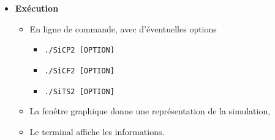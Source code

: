 \begin{itemize}[leftmargin=1cm, label=, itemsep=0pt]
\begin{itemize}[leftmargin=1cm, label=, itemsep=0pt]
\begin{itemize}[leftmargin=1cm, label=, itemsep=0pt]
		\end{itemize}
	\end{itemize}
%
\item {\bf Exécution}
	\begin{itemize}[leftmargin=1cm, label=, itemsep=0pt]
	\item En ligne de commande, avec d'éventuelles options
		\begin{itemize}[leftmargin=1cm, label=, itemsep=0pt]
		\item \texttt{./SiCP2 [OPTION]}
		\item \texttt{./SiCF2 [OPTION]}
		\item \texttt{./SiTS2 [OPTION]}
		\end{itemize}
	\item La fenêtre graphique donne une représentation de la simulation,
	\item Le terminal affiche les informations.
	\end{itemize}
\end{itemize}

